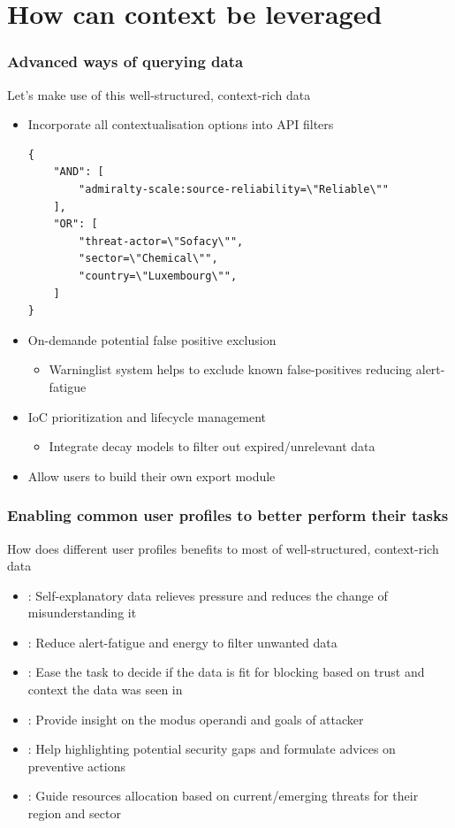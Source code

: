 \section{How can context be leveraged}
\begin{frame}
    \frametitle{Advanced ways of querying data}
    Let's make use of this well-structured, context-rich data
    \begin{itemize}
        \item Incorporate all contextualisation options into API filters
\begin{lstlisting}
{
    "AND": [
        "admiralty-scale:source-reliability=\"Reliable\""
    ],
    "OR": [
        "threat-actor=\"Sofacy\"",
        "sector=\"Chemical\"",
        "country=\"Luxembourg\"",
    ]
}
\end{lstlisting}
        \item On-demande potential false positive exclusion
        \begin{itemize}
            \item Warninglist system helps to exclude known false-positives reducing alert-fatigue
        \end{itemize}
        \item IoC prioritization and lifecycle management
        \begin{itemize}
            \item Integrate decay models to filter out expired/unrelevant data
        \end{itemize}
        \item Allow users to build their own export module
    \end{itemize}
\end{frame}

\begin{frame}
    \frametitle{Enabling common user profiles to better perform their tasks}
    How does different user profiles benefits to most of well-structured, context-rich data
    \begin{itemize}
        \item[\textbf{incident responder}]: Self-explanatory data relieves pressure and reduces the change of misunderstanding it
        \item[\textbf{SOC operator}]: Reduce alert-fatigue and energy to filter unwanted data
        \item[\textbf{ISP}]: Ease the task to decide if the data is fit for blocking based on trust and context the data was seen in
        \item[\textbf{threat analyst}]: Provide insight on the modus operandi and goals of attacker
        \item[\textbf{risk analyst}]: Help highlighting potential security gaps and formulate advices on preventive actions
        \item[\textbf{decision maker}]: Guide resources allocation based on current/emerging threats for their region and sector
    \end{itemize}
\end{frame}


